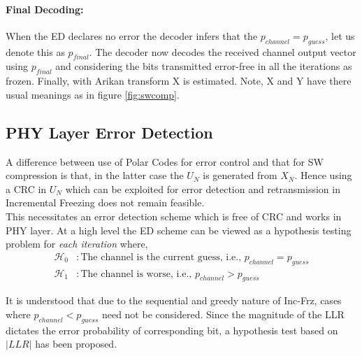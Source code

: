 \documentclass[
11pt, %
a4paper, %
oneside, %
headinclude,footinclude, %
BCOR5mm, %
]{scrartcl}
\begin{document}
\paragraph{Final Decoding:}When the ED declares no error the decoder infers that the $p_{channel}=p_{guess}$, let us denote this as $p_{final}$. The decoder now  decodes the received channel output vector using $p_{final}$ and considering the bits transmitted error-free in all the iterations as frozen. Finally, with Arikan transform X is estimated.
Note, X and Y have there usual meanings as in figure \ref{fig:swcomp}. 


\subsection{PHY Layer Error Detection} 

A difference between use of Polar Codes for error control and that for SW compression is that, in the latter case the $U_N$ is generated from $X_N$. Hence using a CRC in $U_N$ which can be exploited for error detection and retransmission in Incremental Freezing does not remain feasible.\\This necessitates an error detection scheme which is free of CRC and works in PHY layer. At a high level the ED scheme can be viewed as a hypothesis testing problem for \emph{each iteration} where,
\begin{align*}
\mathcal{H}_0 & :\text{The channel is the current guess, i.e., } p_{channel}=p_{guess}\\
\mathcal{H}_1 & :\text{The channel is worse, i.e., } p_{channel} > p_{guess}
\end{align*}

It is understood that due to the sequential and greedy nature of Inc-Frz, cases where $p_{channel} < p_{guess}$ need not be considered. Since the magnitude of the LLR dictates the error probability of corresponding bit, a hypothesis test based on $|LLR|$ has been proposed.
\end{document}
